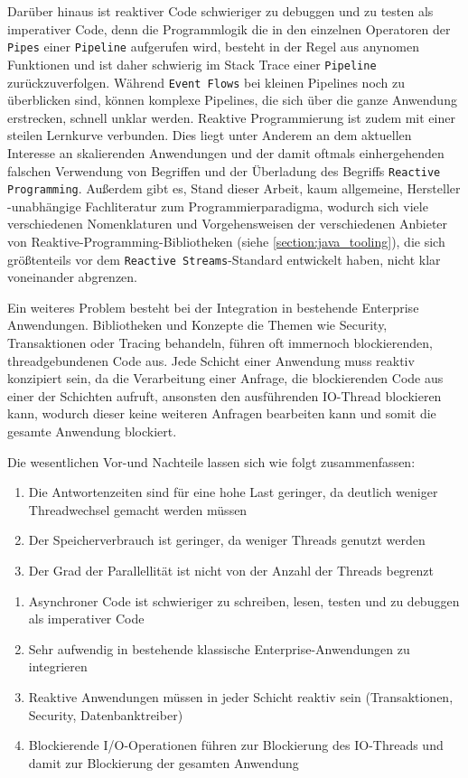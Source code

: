 Darüber hinaus ist reaktiver Code schwieriger zu debuggen und zu testen als imperativer Code, denn die Programmlogik die in den einzelnen Operatoren
der \verb|Pipes| einer \verb|Pipeline| aufgerufen wird, besteht in der Regel aus anynomen Funktionen und ist daher schwierig im Stack Trace einer
\verb|Pipeline| zurückzuverfolgen.
Während \verb|Event Flows| bei kleinen Pipelines noch zu überblicken sind, können komplexe Pipelines, die sich über die ganze Anwendung erstrecken,
schnell unklar werden.
Reaktive Programmierung ist zudem mit einer steilen Lernkurve verbunden. Dies liegt unter Anderem an dem aktuellen Interesse an skalierenden
Anwendungen und der damit oftmals einhergehenden falschen Verwendung von Begriffen und der Überladung des Begriffs \verb|Reactive Programming|.
Außerdem gibt es, Stand dieser Arbeit, kaum allgemeine, Hersteller
-unabhängige Fachliteratur zum Programmierparadigma, wodurch sich viele verschiedenen Nomenklaturen und Vorgehensweisen der verschiedenen Anbieter von
Reaktive-Programming-Bibliotheken (siehe \ref{section:java_tooling}), die sich größtenteils vor dem \verb|Reactive Streams|-Standard entwickelt haben,
nicht klar voneinander abgrenzen.

Ein weiteres Problem besteht bei der Integration in bestehende Enterprise Anwendungen. Bibliotheken und Konzepte die Themen wie
Security, Transaktionen oder Tracing behandeln, führen oft immernoch blockierenden, threadgebundenen Code aus.
Jede Schicht einer Anwendung muss reaktiv konzipiert sein, da die Verarbeitung einer Anfrage, die blockierenden Code aus einer der
Schichten aufruft, ansonsten den ausführenden IO-Thread blockieren kann, wodurch dieser keine weiteren Anfragen bearbeiten kann und somit die gesamte Anwendung blockiert.

Die wesentlichen Vor-und Nachteile lassen sich wie folgt zusammenfassen:
\begin{enumerate}
	\item Die Antwortenzeiten sind für eine hohe Last geringer, da deutlich weniger Threadwechsel gemacht werden müssen
	\item Der Speicherverbrauch ist geringer, da weniger Threads genutzt werden
	\item Der Grad der Parallellität ist nicht von der Anzahl der Threads begrenzt
\end{enumerate}

\begin{enumerate}
	\item Asynchroner Code ist schwieriger zu schreiben, lesen, testen und zu debuggen als imperativer Code
	\item Sehr aufwendig in bestehende klassische Enterprise-Anwendungen zu integrieren
	\item Reaktive Anwendungen müssen in jeder Schicht reaktiv sein (Transaktionen, Security, Datenbanktreiber)
	\item Blockierende I/O-Operationen führen zur Blockierung des IO-Threads und damit zur Blockierung der gesamten Anwendung
\end{enumerate}

